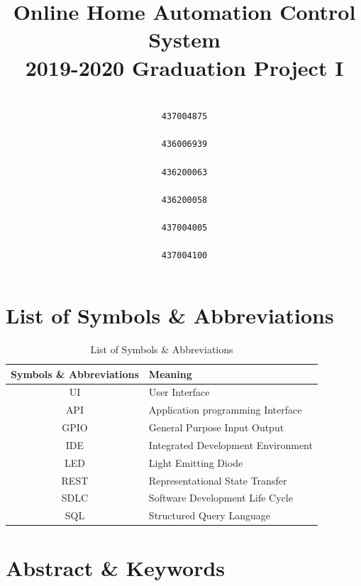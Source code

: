 \documentclass[a4paper, 12pt, oneside]{book}
\date{}
\title{
	\color{section}
	Online Home Automation Control System \\
		\color{ssub}\large 2019-2020 Graduation Project I }
\author{
	\setcode{utf8}
	\RL{ريم علي الغامدي} 
	\\\texttt{437004875}
	\\[3ex]
	\RL{ساره خالد آل حسين} 
	\\\texttt{436006939}
	\\[3ex]
	\RL{ضحى نضال الزعبي} 
	\\\texttt{436200063}
	\\[3ex]
	\RL{عبير أحمد عزت} 
	\\\texttt{436200058}
	\\[3ex]
	\RL{منى سعود الخثلان} 
	\\\texttt{437004005}
	\\[3ex]
	\RL{نوف عبد الله الدعجاني} 
	\\\texttt{437004100}
}
\newcommand\boldcolor[1]{\textcolor{bold}{\textbf{#1}}}
\begin{document}
	
	
	\maketitle
	\newpage

	
	\tableofcontents
	\newpage	
	\doublespacing
	\newpage
	
	\listoftables
	\newpage
	
	\listoffigures
	\newpage
	


	
	\chapter*{List of Symbols \& Abbreviations}
	\label{sec:sym}
	\def\arraystretch{1.5}
	\begin{table}[H]
		\caption{List of Symbols \& Abbreviations}
		\begin{center}
			\begin{tabularx}{\linewidth}{|c|X|}\hline
				
				\boldcolor{Symbols \& Abbreviations} & \boldcolor{Meaning} \\\hline
				UI & User Interface\\\hline
				API & Application programming Interface\\\hline
				GPIO & General Purpose Input Output\\\hline
				IDE & Integrated Development Environment \\\hline
				LED & Light Emitting Diode\\\hline
				REST & Representational State Transfer\\\hline
				SDLC & Software Development Life Cycle\\\hline
				SQL & Structured Query Language\\\hline
			\end{tabularx}
		\end{center}
	\end{table}
	\chapter*{Abstract \& Keywords}
		\label{sec:intro}
\end{document}
